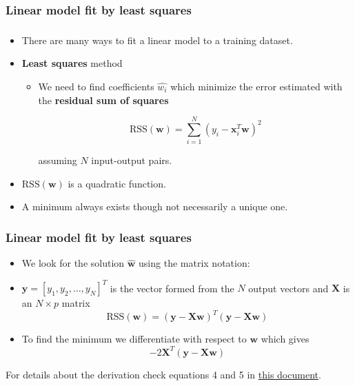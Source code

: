 \documentclass[notes]{beamer}          %
\newcommand{\vect}[1]{\bm{#1}}
\begin{document}
\begin{frame}
\frametitle{Linear model fit by least squares}
\frametitle{}
    \begin{itemize}
        \item There are many ways to fit a linear model to a training dataset.
        \item {\bf Least squares} method
            \begin{itemize}
                \item We need to find coefficients $\hat{w_i}$ which minimize the error estimated with the {\bf residual sum of squares}
                \begin{center}
                    $$\mbox{RSS}(\vect{w}) = \sum_{i = 1}^{N}(y_i - \vect{x}_i^T \vect{w})^2$$
                \end{center}
                 assuming $N$ input-output pairs.
            \end{itemize}
        \item $\mbox{RSS}(\vect{w})$ is a quadratic function.
        \item A minimum always exists though not necessarily a unique one.
    \end{itemize}

\end{frame}


\begin{frame}
\frametitle{Linear model fit by least squares}
    \begin{itemize}
        \item We look for the solution $\hat{\vect{w}}$ using the matrix notation:
        \item $\vect{y} = [y_1, y_2, \ldots, y_N]^T$ is the vector formed from the $N$ output vectors and $\vect{X}$ is an $N \times p$ matrix  \\
        $$\mbox{RSS}(\vect{w}) =  (\vect{y} - \vect{X} \vect{w})^T (\vect{y} - \vect{X} \vect{w})$$
        \item To find the minimum we differentiate with respect to $\vect{w}$ which gives
        $$ -2 \vect{X}^T(\vect{y}-\vect{X}\vect{w})$$
    \end{itemize}
    
\vfill
\tiny{For details about the derivation check equations 4 and 5 in \href{https://web.stanford.edu/~mrosenfe/soc_meth_proj3/matrix_OLS_NYU_notes.pdf}{this document}.}

\end{frame}
\end{document}

